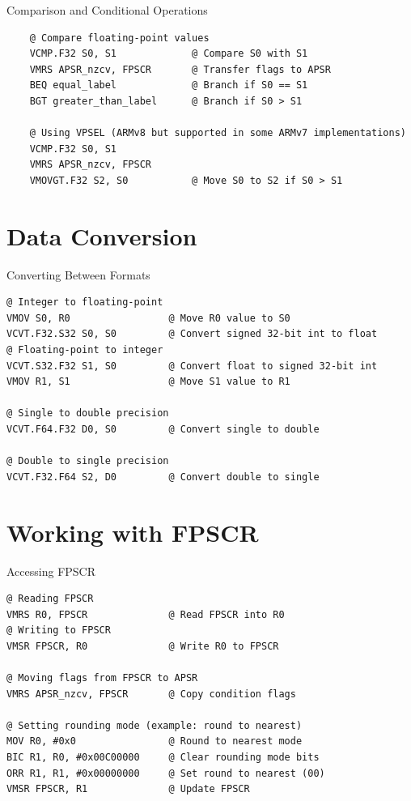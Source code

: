 \documentclass[aspectratio=169]{beamer}
\begin{document}
\begin{frame}[fragile]{Comparison and Conditional Operations}
    \begin{verbatim}
    @ Compare floating-point values
    VCMP.F32 S0, S1             @ Compare S0 with S1
    VMRS APSR_nzcv, FPSCR       @ Transfer flags to APSR
    BEQ equal_label             @ Branch if S0 == S1
    BGT greater_than_label      @ Branch if S0 > S1
    
    @ Using VPSEL (ARMv8 but supported in some ARMv7 implementations)
    VCMP.F32 S0, S1
    VMRS APSR_nzcv, FPSCR
    VMOVGT.F32 S2, S0           @ Move S0 to S2 if S0 > S1
    \end{verbatim}
\end{frame}

\section{Data Conversion}
\begin{frame}
    \sectionpage
\end{frame}

\begin{frame}[fragile]{Converting Between Formats}
\begin{verbatim}
@ Integer to floating-point
VMOV S0, R0                 @ Move R0 value to S0
VCVT.F32.S32 S0, S0         @ Convert signed 32-bit int to float
@ Floating-point to integer
VCVT.S32.F32 S1, S0         @ Convert float to signed 32-bit int
VMOV R1, S1                 @ Move S1 value to R1

@ Single to double precision
VCVT.F64.F32 D0, S0         @ Convert single to double

@ Double to single precision
VCVT.F32.F64 S2, D0         @ Convert double to single
\end{verbatim}
\end{frame}

\section{Working with FPSCR}
\begin{frame}
    \sectionpage
\end{frame}

\begin{frame}[fragile]{Accessing FPSCR}
\begin{verbatim}
@ Reading FPSCR
VMRS R0, FPSCR              @ Read FPSCR into R0
@ Writing to FPSCR
VMSR FPSCR, R0              @ Write R0 to FPSCR

@ Moving flags from FPSCR to APSR
VMRS APSR_nzcv, FPSCR       @ Copy condition flags

@ Setting rounding mode (example: round to nearest)
MOV R0, #0x0                @ Round to nearest mode
BIC R1, R0, #0x00C00000     @ Clear rounding mode bits
ORR R1, R1, #0x00000000     @ Set round to nearest (00)
VMSR FPSCR, R1              @ Update FPSCR
\end{verbatim}
\end{frame}
\end{document}
